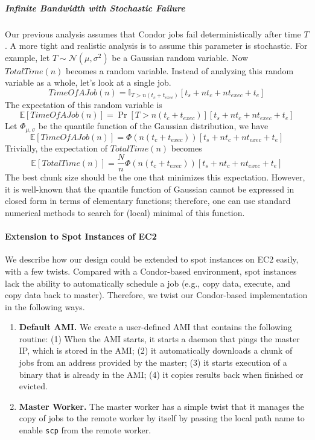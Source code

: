 \documentclass[11pt]{article}
\begin{document}
\subparagraph*{Infinite Bandwidth with Stochastic Failure}

Our previous analysis assumes that Condor jobs fail
deterministically after time $T$. A more tight and realistic
analysis is to assume this parameter is stochastic. For example,
let $T\sim\mathcal{N}(\mu, \sigma^2)$ be a Gaussian random variable.
Now $TotalTime(n)$ becomes a random variable.
Instead of analyzing this random variable as a whole, let's
look at a single job.
\[
TimeOfAJob(n) = \mathbb{I}_{T>n(t_c+t_{exec})} \left[ t_s + nt_c + nt_{exec}  + t_e \right]
\]
The expectation of this random variable is
\[
\mathbb{E}\left[TimeOfAJob(n)\right] = \Pr[T>n(t_c+t_{exec})] \left[ t_s + nt_c + nt_{exec}  + t_e \right]
\]
Let $\Phi_{\mu,\sigma}$ be the quantile function
of the Gaussian distribution, we have
\[
\mathbb{E}\left[TimeOfAJob(n)\right] = \Phi(n(t_c+t_{exec})) \left[ t_s + nt_c + nt_{exec}  + t_e \right]
\]
Trivially, the expectation of $TotalTime(n)$ becomes
\[
\mathbb{E}\left[TotalTime(n)\right] = \frac{N}{n} \Phi(n(t_c+t_{exec})) \left[ t_s + nt_c + nt_{exec}  + t_e \right]
\]
The best chunk size should be the one that minimizes this 
expectation. However, it is well-known that the quantile
function of Gaussian cannot be expressed in closed form in 
terms of elementary functions; therefore, one can use
standard numerical methods to search for (local) minimal
of this function.


\paragraph*{Extension to Spot Instances of EC2}

We describe how our design could be extended to spot instances
on EC2 easily, with a few twists. Compared with a Condor-based
environment, spot instances lack the ability to automatically
schedule a job (e.g., copy data, execute, and copy data back
to master). Therefore, we twist our Condor-based implementation
in the following ways.
\begin{enumerate}
\item {\bf Default AMI.} We create a user-defined AMI that contains
the following routine: (1) When the AMI starts, it starts a daemon
that pings the master IP, which is stored in the AMI; (2) it
automatically downloads a chunk of jobs from an address provided
by the master; (3) it starts execution of a binary that is
already in the AMI; (4) it copies results back when finished
or evicted.
\item {\bf Master Worker.} The master worker has a simple twist
that it manages the copy of jobs to the remote worker by itself
by passing the local path name to enable \texttt{scp} from 
the remote worker. 
\end{enumerate}
\end{document}
